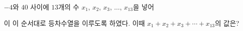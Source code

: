 $-4$와 $40$ 사이에 $13$개의 수 $x_1$, $x_2$, $x_3$, $\ldots$, $x_{13}$을 넣어\par\smallskip{}\par\smallskip\noindent 이 이 순서대로 등차수열을 이루도록 하였다. 이때 $x_1+x_2+x_3+\cdots+x_{13}$의 값은?
